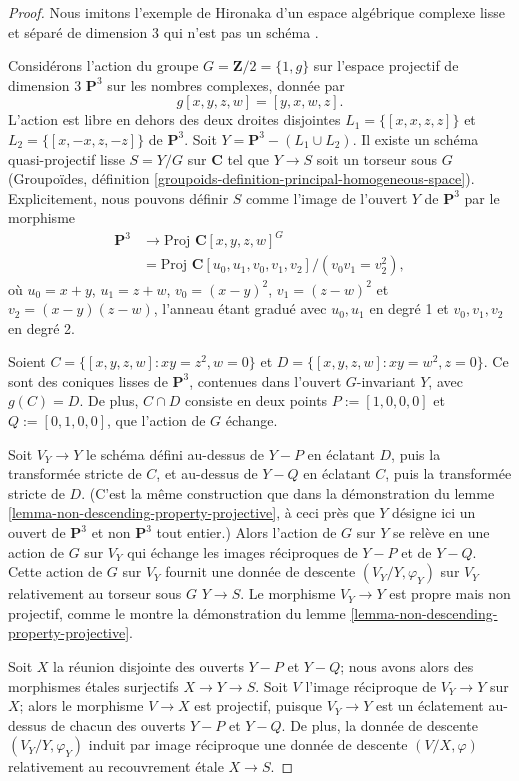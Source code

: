 \begin{proof}
Nous imitons l'exemple de Hironaka d'un espace algébrique complexe
lisse et séparé de dimension 3
qui n'est pas un schéma \cite[exemple B.3.4.2]{H}.

\medskip\noindent
Considérons l'action du groupe $G = \mathbf{Z}/2 = \{1, g\}$
sur l'espace projectif de dimension 3
$\mathbf{P}^3$ sur les nombres complexes, donnée par
$$
g[x,y,z,w] = [y,x,w,z].
$$
L'action est libre en dehors des deux droites disjointes
$L_1=\{ [x,x,z,z]\}$ et $L_2=\{ [x,-x,z,-z]\}$ de
${\mathbf P}^3$. Soit $Y={\mathbf P}^3-(L_1\cup L_2)$. Il existe un
schéma quasi-projectif lisse $S=Y/G$ sur ${\mathbf C}$ tel que
$Y\to S$ soit un torseur sous $G$ (Groupoïdes,
définition \ref{groupoids-definition-principal-homogeneous-space}).
Explicitement, nous pouvons définir $S$ comme l'image de l'ouvert $Y$
de ${\mathbf P}^3$ par le morphisme
\begin{align*}
{\mathbf P}^3 & \to \text{Proj } {\mathbf C}[x,y,z,w]^G\\
   & = \text{Proj } {\mathbf C}[u_0,u_1,v_0,v_1,v_2]/(v_0v_1=v_2^2),
\end{align*}
où $u_0=x+y$, $u_1=z+w$, $v_0=(x-y)^2$, $v_1=(z-w)^2$
et $v_2=(x-y)(z-w)$, l'anneau étant gradué avec $u_0,u_1$
en degré 1 et $v_0,v_1,v_2$ en degré 2.

\medskip\noindent
Soient $C=\{ [x,y,z,w]: xy=z^2, w=0\}$ et $D=\{ [x,y,z,w]:
xy=w^2, z=0\}$. Ce sont des coniques lisses de ${\mathbf P}^3$, contenues
dans l'ouvert $G$-invariant $Y$, avec $g(C)=D$. De plus,
$C\cap D$ consiste en deux points $P:=[1,0,0,0]$
et $Q:=[0,1,0,0]$, que l'action
de $G$ échange.

\medskip\noindent
Soit $V_Y\to Y$ le schéma défini au-dessus de $Y-P$
en éclatant $D$, puis la transformée stricte
de $C$, et au-dessus de $Y-Q$ en éclatant $C$, puis
la transformée stricte de $D$. (C'est la même construction
que dans la démonstration du lemme \ref{lemma-non-descending-property-projective},
à ceci près que $Y$ désigne ici un ouvert de ${\mathbf P}^3$
et non ${\mathbf P}^3$ tout entier.)
Alors l'action de $G$ sur $Y$ se relève en une action de $G$ sur $V_Y$
qui échange les images réciproques de $Y-P$ et de $Y-Q$. Cette action
de $G$ sur $V_Y$ fournit une donnée de descente $(V_Y/Y,\varphi_Y)$
sur $V_Y$ relativement au torseur sous $G$
$Y\to S$. Le morphisme $V_Y\to Y$
est propre mais non projectif, comme le montre la démonstration
du lemme \ref{lemma-non-descending-property-projective}.

\medskip\noindent
Soit $X$ la réunion disjointe des ouverts $Y-P$ et $Y-Q$;
nous avons alors des morphismes étales surjectifs $X\to Y\to S$.
Soit $V$ l'image réciproque de $V_Y\to Y$ sur $X$; alors le morphisme
$V\to X$ est projectif, puisque $V_Y\to Y$ est un éclatement au-dessus de chacun des ouverts
$Y-P$ et $Y-Q$. De plus, la donnée de descente $(V_Y/Y,\varphi_Y)$
induit par image réciproque une donnée de descente $(V/X,\varphi)$ relativement au
recouvrement étale $X\to S$.


\end{proof}
